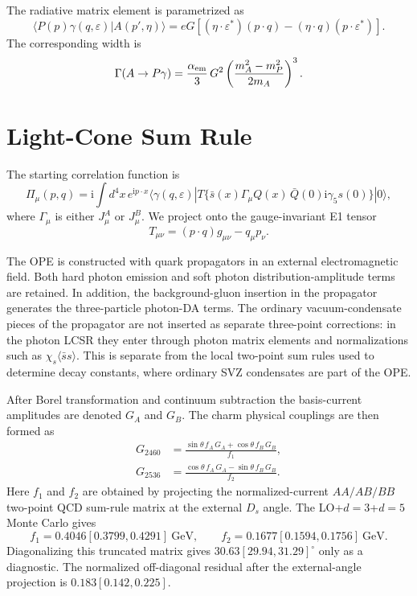 \documentclass[11pt]{article}
\newcommand{\ii}{\mathrm{i}}
\newcommand{\GeV}{\mathrm{GeV}}
\newcommand{\ssbar}{\langle\bar s s\rangle}
\begin{document}
The radiative matrix element is parametrized as
\begin{equation}
  \langle P(p)\gamma(q,\varepsilon)|A(p',\eta)\rangle
  =
  eG\left[(\eta\cdot\varepsilon^*)(p\cdot q)
  -(\eta\cdot q)(p\cdot\varepsilon^*)\right].
  \label{eq:e1-definition}
\end{equation}
The corresponding width is
\begin{equation}
  \Gamma(A\to P\gamma)
  =
  \frac{\alpha_{\rm em}}{3}\,G^2
  \left(\frac{m_A^2-m_P^2}{2m_A}\right)^3 .
  \label{eq:width}
\end{equation}

\section{Light-Cone Sum Rule}

The starting correlation function is
\begin{equation}
  \Pi_\mu(p,q)=\ii\int d^4x\,e^{\ii p\cdot x}
  \langle\gamma(q,\varepsilon)|
  T\{\bar s(x)\Gamma_\mu Q(x)\,\bar Q(0)\ii\gamma_5 s(0)\}
  |0\rangle ,
  \label{eq:correlator}
\end{equation}
where $\Gamma_\mu$ is either $J^A_\mu$ or $J^B_\mu$.  We project onto the
gauge-invariant E1 tensor
\begin{equation}
  T_{\mu\nu}=(p\cdot q)g_{\mu\nu}-q_\mu p_\nu .
\end{equation}

The OPE is constructed with quark propagators in an external electromagnetic
field.  Both hard photon emission and soft photon distribution-amplitude terms
are retained.  In addition, the background-gluon insertion in the propagator
generates the three-particle photon-DA terms.  The ordinary vacuum-condensate
pieces of the propagator are not inserted as separate three-point corrections:
in the photon LCSR they enter through photon matrix elements and normalizations
such as $\chi_s\ssbar$.  This is separate from the local two-point sum rules
used to determine decay constants, where ordinary SVZ condensates are part of
the OPE.

After Borel transformation and continuum subtraction the basis-current
amplitudes are denoted $G_A$ and $G_B$.  The charm physical couplings are then
formed as
\begin{align}
  G_{2460} &=
  \frac{\sin\theta\,f_A\,G_A+\cos\theta\,f_B\,G_B}{f_1},\\
  G_{2536} &=
  \frac{\cos\theta\,f_A\,G_A-\sin\theta\,f_B\,G_B}{f_2}.
  \label{eq:stage3}
\end{align}
Here $f_1$ and $f_2$ are obtained by projecting the normalized-current
$AA/AB/BB$ two-point QCD sum-rule matrix at the external $D_s$ angle.  The
LO+$d=3$+$d=5$ Monte Carlo gives
\begin{equation}
f_1=0.4046[0.3799,0.4291]~\GeV,\qquad
f_2=0.1677[0.1594,0.1756]~\GeV.
\end{equation}
Diagonalizing this truncated matrix gives
$30.63[29.94,31.29]^\circ$ only as a diagnostic.  The normalized off-diagonal
residual after the external-angle projection is $0.183[0.142,0.225]$.
\end{document}
